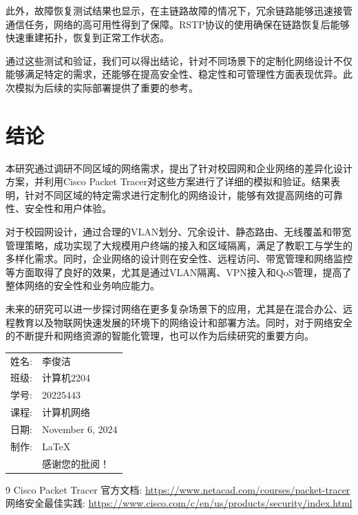 \documentclass[12pt]{article}
\begin{document}
此外，故障恢复测试结果也显示，在主链路故障的情况下，冗余链路能够迅速接管通信任务，网络的高可用性得到了保障。RSTP协议的使用确保在链路恢复后能够快速重建拓扑，恢复到正常工作状态。

通过这些测试和验证，我们可以得出结论，针对不同场景下的定制化网络设计不仅能够满足特定的需求，还能够在提高安全性、稳定性和可管理性方面表现优异。此次模拟为后续的实际部署提供了重要的参考。

\section{结论}
本研究通过调研不同区域的网络需求，提出了针对校园网和企业网络的差异化设计方案，并利用Cisco Packet Tracer对这些方案进行了详细的模拟和验证。结果表明，针对不同区域的特定需求进行定制化的网络设计，能够有效提高网络的可靠性、安全性和用户体验。

对于校园网设计，通过合理的VLAN划分、冗余设计、静态路由、无线覆盖和带宽管理策略，成功实现了大规模用户终端的接入和区域隔离，满足了教职工与学生的多样化需求。同时，企业网络的设计则在安全性、远程访问、带宽管理和网络监控等方面取得了良好的效果，尤其是通过VLAN隔离、VPN接入和QoS管理，提高了整体网络的安全性和业务响应能力。

未来的研究可以进一步探讨网络在更多复杂场景下的应用，尤其是在混合办公、远程教育以及物联网快速发展的环境下的网络设计和部署方法。同时，对于网络安全的不断提升和网络资源的智能化管理，也可以作为后续研究的重要方向。

\begin{flushright}
\begin{tabular}{rl}
    姓名: & 李俊洁\\
    班级: & 计算机2204 \\
    学号: & 20225443 \\
    课程: & 计算机网络 \\
    日期: & November 6, 2024 \\
    制作: & \LaTeX \\
    & 感谢您的批阅！
\end{tabular}
\end{flushright}

\begin{thebibliography}{9}
 Cisco Packet Tracer 官方文档: \url{https://www.netacad.com/courses/packet-tracer}
 网络安全最佳实践: \url{https://www.cisco.com/c/en/us/products/security/index.html}
\end{thebibliography}
\end{document}
